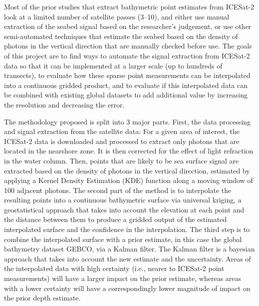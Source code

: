 Most of the prior studies that extract bathymetric point estimates from ICESat-2 look at a limited number of satellite passes (3--10), and either use manual extraction of the seabed signal based on the researcher's judgement, or use other semi-automated techniques that estimate the seabed based on the density of photons in the vertical direction that are manually checked before use. The goals of this project are to find ways to automate the signal extraction from ICESat-2 data so that it can be implemented at a larger scale (up to hundreds of transects), to evaluate how these sparse point measurements can be interpolated into a continuous gridded product, and to evaluate if this interpolated data can be combined with existing global datasets to add additional value by increasing the resolution and decreasing the error. 
\vskip 0.1in

The methodology proposed is split into 3 major parts. First, the data processing and signal extraction from the satellite data: For a given area of interest, the ICESat-2 data is downloaded and processed to extract only photons that are located in the nearshore zone. It is then corrected for the effect of light refraction in the water column. Then, points that are likely to be sea surface signal are extracted based on the density of photons in the vertical direction, estimated by applying a Kernel Density Estimation (KDE) function along a moving window of 100 adjacent photons. The second part of the method is to interpolate the resulting points into a continuous bathymetric surface via universal kriging, a geostatistical approach that takes into account the elevation at each point and the distance between them to produce a gridded output of the estimated interpolated surface and the confidence in the interpolation. The third step is to combine the interpolated surface with a prior estimate, in this case the global bathymetry dataset GEBCO, via a Kalman filter. The Kalman filter is a bayesian approach that takes into account the new estimate and the uncertainty. Areas of the interpolated data with high certainty (i.e., nearer to ICESat-2 point measurements) will have a larger impact on the prior estimate, whereas areas with a lower certainty will have a correspondingly lower magnitude of impact on the prior depth estimate.
\vskip 0.1in

